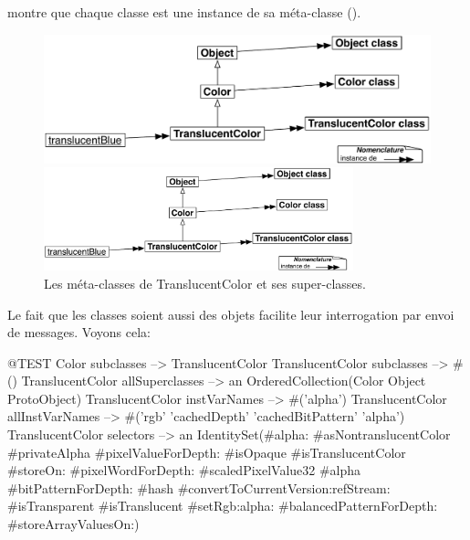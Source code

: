 \documentclass[a4paper,10pt,twoside]{book}
\begin{document}
\noindent
{} montre que chaque classe est une instance de sa méta-classe ().

\begin{center}
\begin{figure}[!ht]
\ifluluelse
	{\centerline {\includegraphics[width=\textwidth]{TranslucentMetaclasses}}}
	{\centerline {\includegraphics[width=0.8\textwidth]{TranslucentMetaclasses}}}
\caption{Les méta-classes de TranslucentColor et ses super-classes.\label{fig:translucentmetaclasses}}
\end{figure}
\end{center}


Le fait que les classes soient aussi des objets facilite leur interrogation par envoi de messages.
Voyons cela:
\begin{code}{@TEST}
Color subclasses                           --> {TranslucentColor}
TranslucentColor subclasses         --> #()
TranslucentColor allSuperclasses  --> an OrderedCollection(Color Object ProtoObject)
TranslucentColor instVarNames     --> #('alpha')
TranslucentColor allInstVarNames --> #('rgb' 'cachedDepth' 'cachedBitPattern' 'alpha')
TranslucentColor selectors             --> an IdentitySet(#alpha: #asNontranslucentColor #privateAlpha #pixelValueForDepth: #isOpaque #isTranslucentColor #storeOn: #pixelWordForDepth: #scaledPixelValue32 #alpha #bitPatternForDepth: #hash #convertToCurrentVersion:refStream: #isTransparent #isTranslucent #setRgb:alpha: #balancedPatternForDepth: #storeArrayValuesOn:)
\end{code}
\end{document}
